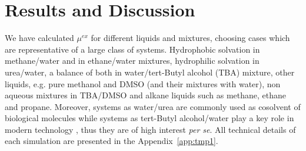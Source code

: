 \documentclass[a4paper,preprint,unsortedaddress]{revtex4-1}
\begin{document}
\section{Results and Discussion}
We have calculated $\mu^{ex}$ for different liquids and mixtures, choosing cases which are representative of a large class of systems. Hydrophobic solvation in methane/water and in ethane/water mixtures, hydrophilic solvation in urea/water, a balance of both in water/tert-Butyl alcohol (TBA) mixture, other liquids, e.g. pure methanol and DMSO (and their mixtures with water), non aqueous mixtures in TBA/DMSO and alkane liquids such as methane, ethane and propane. Moreover, systems as water/urea are commonly used as cosolvent of biological molecules \cite{nico-debashish} while systems as tert-Butyl alcohol/water play a key role in modern technology \cite{irata}, thus they are of high interest {\it per se}. All technical details of each simulation are presented in the Appendix~\ref{app:tmp1}.\\
\end{document}

